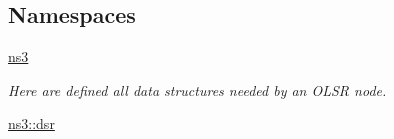 \subsection*{Namespaces}
\begin{DoxyCompactItemize}
\item 
 \hyperlink{namespacens3}{ns3}
\begin{DoxyCompactList}\small\item\em Here are defined all data structures needed by an O\+L\+SR node. \end{DoxyCompactList}\item 
 \hyperlink{namespacens3_1_1dsr}{ns3\+::dsr}
\end{DoxyCompactItemize}
